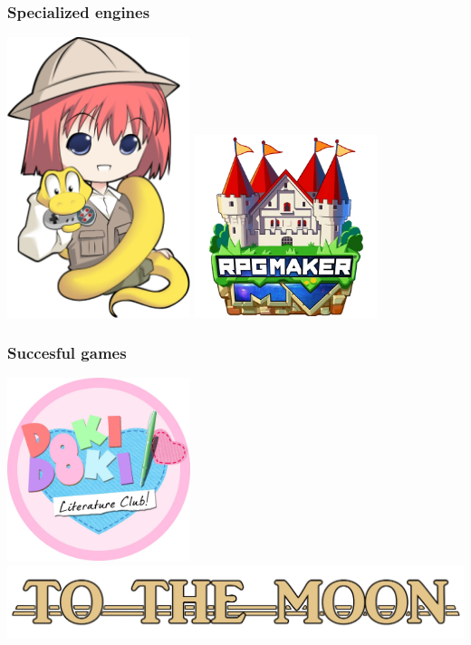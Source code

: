 \documentclass{beamer}
\begin{document}
        \begin{frame}
            \frametitle{Specialized engines}
            \includegraphics[width=0.4\textwidth]{renpy}
            \includegraphics[width=0.4\textwidth]{rpgmaker}
            \end{frame}

        \begin{frame}
            \frametitle{Succesful games}
            \includegraphics[width=0.4\textwidth]{ddlc}
            \includegraphics{tothemoon}
            \end{frame}
            
\end{document}
